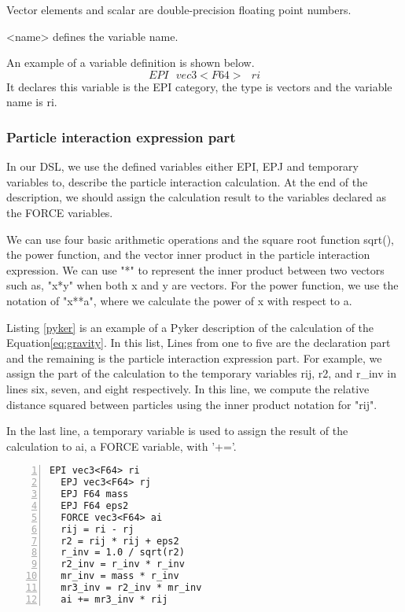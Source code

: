 \documentclass[ams]{article}
\begin{document}
Vector elements and scalar are double-precision floating point numbers.

\textless name\textgreater \text{ } defines the variable name.


 An example of a variable definition is shown below.
\[
  EPI\text{ } vec3<F64> \text{ } ri
\]
It declares this variable is the EPI category, the type is vectors and the variable name is ri.

\subsubsection{Particle interaction expression part}
 In our DSL, we use the defined variables either EPI, EPJ and temporary variables to, describe the particle interaction calculation. At the end of the description, we should assign the calculation result to the variables declared as the FORCE variables.
 
 We can use four basic arithmetic operations and the square root function sqrt(), the power function, and the vector inner product in the particle interaction expression. 
 We can use "*" to represent the inner product between two vectors such as, "x*y" when both x and y are vectors. For the power function, we use the notation of "x**a", where we calculate the power of x with respect to a. 



 Listing \ref{pyker} is an example of a Pyker description of the calculation of the Equation\eqref{eq:gravity}.
 In this list, Lines from one to five are the declaration part and the remaining is the particle interaction expression part.
 For example, we assign the part of the calculation to the temporary variables rij, r2, and r\_inv in lines six, seven, and eight respectively.
 In this line, we compute the relative distance squared between particles using the inner product notation for "rij". 
 
 In the last line, a temporary variable is used to assign the result of the calculation to ai, a FORCE variable, with '+='.
 
\begin{lstlisting}[caption=example of the DSL,frame=single, numbers=left, label=pyker]
  EPI vec3<F64> ri
  EPJ vec3<F64> rj
  EPJ F64 mass
  EPJ F64 eps2
  FORCE vec3<F64> ai
  rij = ri - rj
  r2 = rij * rij + eps2
  r_inv = 1.0 / sqrt(r2)
  r2_inv = r_inv * r_inv
  mr_inv = mass * r_inv
  mr3_inv = r2_inv * mr_inv
  ai += mr3_inv * rij
\end{lstlisting} 
\end{document}
